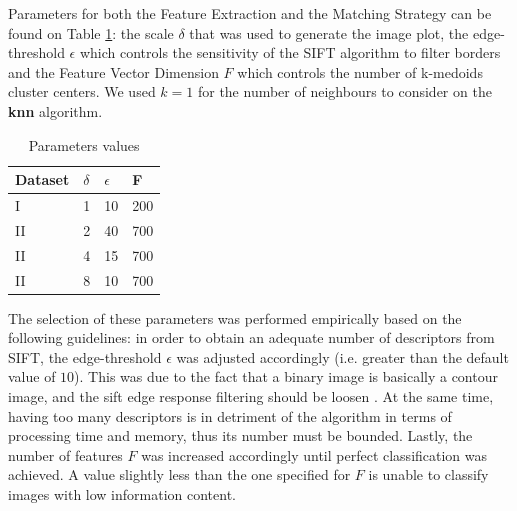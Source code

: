 \documentclass[nouppercase]{ifmbe}
\begin{document}

Parameters for both the Feature Extraction and the Matching Strategy can be found on Table \ref{table2}: the scale $ \delta $ that was used to generate the image plot, the edge-threshold \textbf{$\epsilon$} which controls the sensitivity of the SIFT algorithm to filter borders and the Feature Vector Dimension $ F $ which controls the number of k-medoids cluster centers. We used $ k = 1 $ for the number of neighbours to consider on the \textbf{knn} algorithm.


\begin{table}[h]
        \footnotesize  \onehalfspacing
        \caption{Parameters values}
        \begin{tabular}{p{1.80cm}p{1.80cm}p{1.80cm}p{1.80cm}}
                \hline
                Dataset & $\delta$ & $\epsilon$ & F \\
                \hline
                I  & 1 & 10 & 200 \\
                II & 2 & 40 & 700 \\ 
                II & 4 & 15 & 700 \\               
                II & 8 & 10 & 700 \\
                \hline
        \end{tabular}
        \label{table2}
\end{table}


The selection of these parameters was performed empirically based on the following guidelines:  in order to obtain an adequate number of descriptors from SIFT, the edge-threshold $\epsilon$ was adjusted accordingly (i.e. greater than the default value of $ 10 $). This was due to the fact that a binary image is basically a contour image, and the sift edge response filtering should be loosen \cite{c14}.  At the same time, having too many descriptors is in detriment of the algorithm in terms of processing time and memory, thus its number must be bounded.  Lastly, the number of features $ F $ was increased accordingly until perfect classification was achieved.  A value slightly less than the one specified for $F$ is unable to classify images with low information content.
\end{document}
